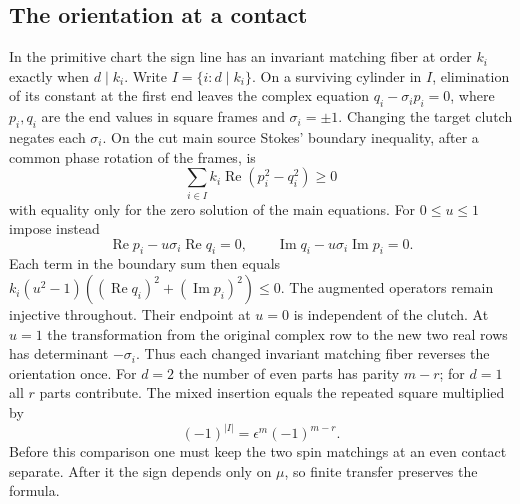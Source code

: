 \subsection{The orientation at a contact}
In the primitive chart the sign line has an invariant matching fiber
at order \(k_i\) exactly when \(d\mid k_i\). Write \(I=\{i:d\mid k_i\}\).
On a surviving cylinder in \(I\), elimination of its constant at the
first end leaves the complex equation \(q_i-\sigma_i p_i=0\), where
\(p_i,q_i\) are the end values in square frames and \(\sigma_i=\pm1\).
Changing the target clutch negates each \(\sigma_i\).
On the cut main source Stokes' boundary inequality, after a common
phase rotation of the frames, is
\[
 \sum_{i\in I} k_i\operatorname{Re}(p_i^2-q_i^2)\ge0
\]
with equality only for the zero solution of the main equations.
For \(0\le u\le1\) impose instead
\[
 \operatorname{Re}p_i-u\sigma_i\operatorname{Re}q_i=0,\qquad
 \operatorname{Im}q_i-u\sigma_i\operatorname{Im}p_i=0 .
\]
Each term in the boundary sum then equals
\(k_i(u^2-1)((\operatorname{Re}q_i)^2+(\operatorname{Im}p_i)^2)\le0\).
The augmented operators remain injective throughout. Their endpoint
at \(u=0\) is independent of the clutch. At \(u=1\) the transformation
from the original complex row to the new two real rows has
determinant \(-\sigma_i\). Thus each changed invariant matching
fiber reverses the orientation once. For \(d=2\) the number of even
parts has parity \(m-r\); for \(d=1\) all \(r\) parts contribute.
The mixed insertion equals the repeated square multiplied by
\begin{equation}\label{eq:clutch}
 (-1)^{|I|}=\epsilon^m(-1)^{m-r}.
\end{equation}
Before this comparison one must keep the two spin matchings at an
even contact separate. After it the sign depends only on \(\mu\),
so finite transfer preserves the formula.

